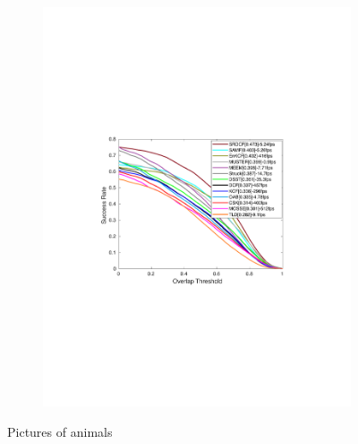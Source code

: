 \documentclass[10pt,twocolumn,letterpaper]{article}
\newcounter{ct}
\begin{document}
\begin{figure}
\begin{subfigure}[b]{0.25\textwidth}
                \includegraphics[width=\linewidth]{./figures/Success_UAV123.pdf}
        \end{subfigure}%
        \caption{Pictures of animals}\label{fig:animals}
\end{figure}
\end{document}
